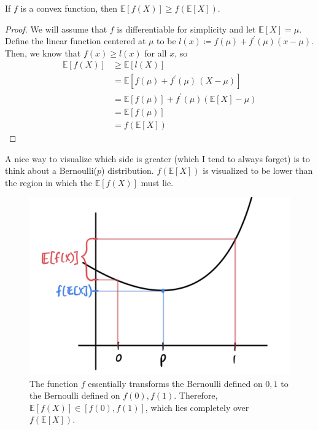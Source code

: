 \documentclass{article}
\begin{document}
      \begin{theorem}
        If $f$ is a convex function, then $\mathbb{E}[f(X)] \geq f (\mathbb{E}[X])$. 
      \end{theorem}
      \begin{proof}
        We will assume that $f$ is differentiable for simplicity and let $\mathbb{E}[X] = \mu$. Define the linear function centered at $\mu$ to be $l(x) \coloneqq f(\mu) + f^\prime (\mu) (x - \mu)$. Then, we know that $f(x) \geq l(x)$ for all $x$, so 
        \begin{align*}
          \mathbb{E}[f(X)] & \geq \mathbb{E}[ l(X)] \\ 
          & = \mathbb{E}[f(\mu) + f^\prime (\mu) \, (X - \mu)] \\
          & = \mathbb{E}[f(\mu)] + f^\prime (\mu) ( \mathbb{E}[X] - \mu) \\
          & = \mathbb{E}[f(\mu)] \\
          & = f(\mathbb{E}[X])
        \end{align*}
      \end{proof}

      A nice way to visualize which side is greater (which I tend to always forget) is to think about a Bernoulli($p$) distribution. $f(\mathbb{E}[X])$ is visualized to be lower than the region in which the $\mathbb{E}[f(X)]$ must lie. 

      \begin{figure}[H]
        \centering 
        \includegraphics[scale=0.4]{img/jensen_visual.png}
        \caption{The function $f$ essentially transforms the Bernoulli defined on $0, 1$ to the Bernoulli defined on $f(0), f(1)$. Therefore, $\mathbb{E}[f(X)] \in [f(0), f(1)]$, which lies completely over $f(\mathbb{E}[X])$.} 
        \label{fig:jensen_visual}
      \end{figure}
\end{document}
